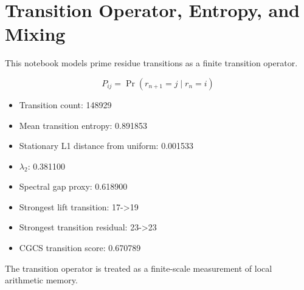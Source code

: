 \section*{Transition Operator, Entropy, and Mixing}

This notebook models prime residue transitions as a finite transition operator.

\[
P_{ij}=\Pr(r_{n+1}=j\mid r_n=i)
\]

\begin{itemize}
  \item Transition count: 148929
  \item Mean transition entropy: 0.891853
  \item Stationary L1 distance from uniform: 0.001533
  \item $\lambda_2$: 0.381100
  \item Spectral gap proxy: 0.618900
  \item Strongest lift transition: 17->19
  \item Strongest transition residual: 23->23
  \item CGCS transition score: 0.670789
\end{itemize}

The transition operator is treated as a finite-scale measurement of local arithmetic memory.
